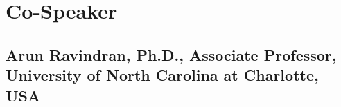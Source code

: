 \documentclass[12pt]{article}
\begin{document}
\pagebreak
\section*{Co-Speaker}
\subsection*{Arun Ravindran, Ph.D., Associate Professor, University of North Carolina at Charlotte, USA}
\end{document}
